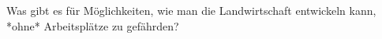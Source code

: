 	Was gibt es für Möglichkeiten, wie man die Landwirtschaft entwickeln kann, *ohne* Arbeitsplätze zu gefährden? 